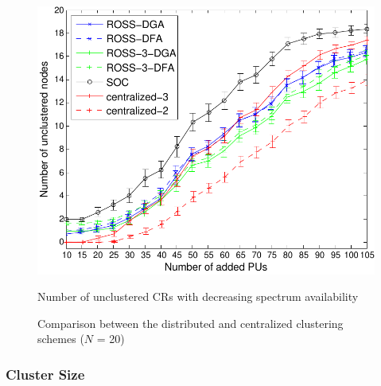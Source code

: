 \documentclass[times]{ettauth}
\theoremstyle{mytheoremstyle}
\theoremstyle{mytheoremstyle}
\theoremstyle{mytheoremstyle}
\begin{document}
\begin{figure}[th]
\begin{multicols}{3}
    \includegraphics[width=\linewidth]{survival_rate_20.pdf}\par\caption{Number of unclustered CRs with decreasing spectrum availability}\label{singleton_clusters}
\end{multicols}
\caption{Comparison between the distributed and centralized clustering schemes ($N$ = 20)}
\label{compare_dis_centralized}
\end{figure}



\subsubsection{Cluster Size}
\label{cluster_size}
\end{document}
